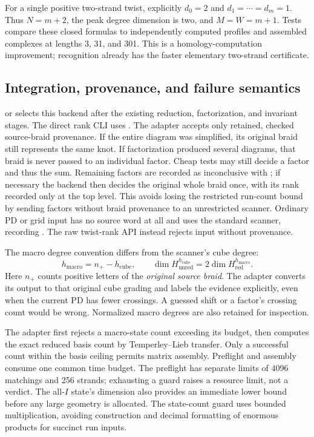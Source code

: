 For a single positive two-strand twist, explicitly $d_0=2$ and
$d_1=\cdots=d_m=1$. Thus $N=m+2$, the peak degree dimension is two,
and $M=W=m+1$. Tests compare these closed formulas to independently
computed profiles and assembled complexes at lengths 3, 31, and 301.
This is a homology-computation improvement; recognition already has
the faster elementary two-strand certificate.

\subsection{Integration, provenance, and failure semantics}
 or  selects this backend
after the existing reduction, factorization, and invariant stages.
The direct rank CLI uses . The adapter accepts
only retained, checked source-braid provenance. If the entire diagram
was simplified, its original braid still represents the same knot.
If factorization produced several diagrams, that braid is never passed
to an individual factor. Cheap tests may still decide a factor and thus
the sum. Remaining factors are recorded as inconclusive with
; if necessary the backend then decides the
original whole braid once, with its rank recorded only at the top level.
This avoids losing the restricted run-count bound by sending factors
without braid provenance to an unrestricted scanner. Ordinary PD or grid
input has no source word at all and uses the standard scanner, recording
. The raw twist-rank API instead
rejects input without provenance.

The macro degree convention differs from the scanner's cube degree:
\[
 h_{\mathrm{macro}}=n_+-h_{\mathrm{cube}},\qquad
 \dim H_{\mathrm{unred}}^{h_{\mathrm{cube}}}
       =2\dim H_{\mathrm{red}}^{h_{\mathrm{macro}}}.
\]
Here $n_+$ counts positive letters of the \emph{original source braid}.
The adapter converts its output to that original cube grading and
labels the evidence explicitly, even when the current PD has fewer
crossings. A guessed shift or a factor's crossing count would be wrong.
Normalized macro degrees are also retained for inspection.

The adapter first rejects a macro-state count exceeding its budget,
then computes the exact reduced basis count by Temperley--Lieb transfer.
Only a successful count within the basis ceiling permits matrix assembly.
Preflight and assembly consume one common time budget. The preflight has
separate limits of 4096 matchings and 256 strands; exhausting a guard
raises a resource limit, not a verdict. The all-$I$ state's dimension
also provides an immediate lower bound before any large geometry is
allocated. The state-count guard uses bounded multiplication, avoiding
construction and decimal formatting of enormous products for succinct
run inputs.

